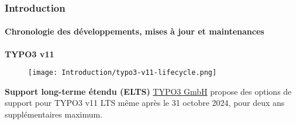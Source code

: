 %

\begin{frame}[fragile]
	\frametitle{Introduction}
	\framesubtitle{Chronologie des développements, mises à jour et maintenances}

	\textbf{TYPO3 v11}

	\begin{figure}
		\texttt{[image: Introduction/typo3-v11-lifecycle.png]}
	\end{figure}

	\textbf{Support long-terme étendu (ELTS)}\newline
	\smaller
		\href{https://typo3.com}{TYPO3 GmbH} propose des options de support
		pour TYPO3 v11 LTS même après le 31 octobre 2024, pour deux ans supplémentaires
		maximum.
	\normalsize

\end{frame}

